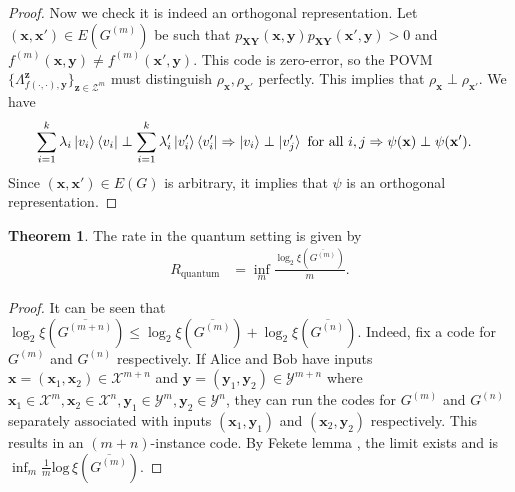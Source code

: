 \documentclass[journal, onecolumn, draftcls]{IEEEtran}
\theoremstyle{definition}
\newtheorem{theorem}{Theorem}
\newcommand{\calX}{\mathcal{X}}
\newcommand{\calY}{\mathcal{Y}}
\newcommand{\calZ}{\mathcal{Z}}
\newcommand{\bfy}{\mathbf{y}}
\newcommand{\bfX}{\mathbf{X}}
\newcommand{\bfY}{\mathbf{Y}}
\newcommand{\bfx}{\mathbf{x}}
\newcommand{\bfz}{\mathbf{z}}
\newcommand{\meng}[1]{\marginpar{+}{\bf Ruoyu's remark}: {\em #1}}
\newcommand{\aditya}[1]{\marginpar{+}{\bf Aditya's remark}: {\em #1}}
\begin{document}
\begin{proof}


Now we check it is indeed an orthogonal representation. Let    $(\bfx,\bfx')\in E(G^{(m)})$ be such that $p_{\bfX\bfY}(\bfx,\bfy)p_{\bfX\bfY}(\bfx',\bfy)>0$ and $f^{(m)}(\bfx,\bfy)\ne f^{(m)}(\bfx',\bfy)$.  This code  is zero-error, so the POVM $\{\Lambda^\bfz_{f(\cdot,\cdot), \bfy}\}_{\bfz \in \calZ^m}$ must distinguish $\rho_{\bfx},\rho_{\bfx'}$ perfectly. This implies that $\rho_{\bfx}\perp\rho_{\bfx'}$. We have 
\begin{align*}
   &  \sum_{i=1}^k \lambda_i\ket{v_i}\bra{v_i}  \perp  \sum_{i=1}^k \lambda_i'\ket{v_i'}\bra{v_i'}  \Rightarrow \ket{v_i}\perp\ket{v_j'}\text{ for all }i,j
   \Rightarrow \psi(\bfx) \perp \psi(\bfx').
\end{align*}
Since $(\bfx,\bfx')\in E(G)$ is arbitrary, it implies that $\psi$ is an orthogonal representation.  
\end{proof}



 

\begin{theorem}\label{thm:witsenhausen_quantum_rate}  The rate in the quantum setting is given by 
\begin{align*}
    R_{\text{quantum}} &= \inf_m \frac{\log_2\xi(\overline{G^{(m)}})}{m}.
\end{align*}
\end{theorem} 
\begin{proof} 
It can be seen that $\log_2\xi(\overline{G^{(m+n)}})\le\log_2\xi(\overline{G^{(m)}})+\log_2\xi(\overline{G^{(n)}})$. Indeed, fix a code for $G^{(m)}$ and $G^{(n)}$ respectively. If Alice and Bob have inputs $\bfx = (\bfx_1,\bfx_2)\in \calX^{m+n}$ and $\bfy = (\bfy_1,\bfy_2) \in \calY^{m+n}$ where $\bfx_1\in \calX^m,\bfx_2\in \calX^n,\bfy_1\in\calY^m,\bfy_2\in\calY^n$, they can run the codes for $G^{(m)}$ and $G^{(n)}$ separately associated with inputs $(\bfx_1,\bfy_1)$ and $(\bfx_2,\bfy_2)$ respectively. This results in an $(m+n)$-instance code. %
By Fekete lemma \cite{Fekete_23}, the limit exists and is $\inf_m \frac{1}{m}\text{log}\, \xi (\overline{G^{(m)}})$.
\end{proof}
\end{document}
